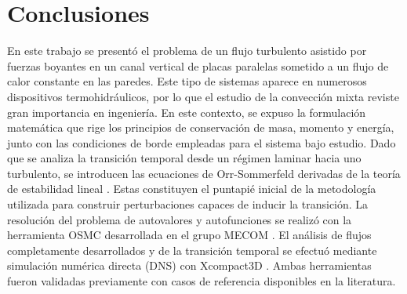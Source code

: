 \chapter{Conclusiones} \label{cap:conclusiones}

En este trabajo se presentó el problema de un flujo turbulento asistido por fuerzas \linebreak boyantes en un canal vertical de placas paralelas sometido a un flujo de calor constante en las paredes. Este tipo de sistemas aparece en numerosos dispositivos termohidráulicos, por lo que el estudio de la convección mixta reviste gran importancia en ingeniería. En este contexto, se expuso la formulación matemática que rige los principios de conservación de masa, momento y energía, junto con las condiciones de borde empleadas para el sistema bajo estudio. Dado que se analiza la transición temporal desde un régimen laminar hacia uno turbulento, se introducen las ecuaciones de Orr-Sommerfeld derivadas de la teoría de \linebreak estabilidad lineal \cite{chen1996linear}. Estas constituyen el puntapié inicial de la metodología utilizada para construir perturbaciones capaces de inducir la transición. La resolución del problema de autovalores y autofunciones se realizó con la herramienta OSMC desarrollada en el grupo MECOM \cite{szuban2023}. El análisis de flujos completamente desarrollados y de la transición temporal se efectuó mediante simulación numérica directa (DNS) con Xcompact3D \cite{bartholomew2020xcompact3d}. Ambas herramientas fueron validadas previamente con casos de referencia disponibles en la literatura.


